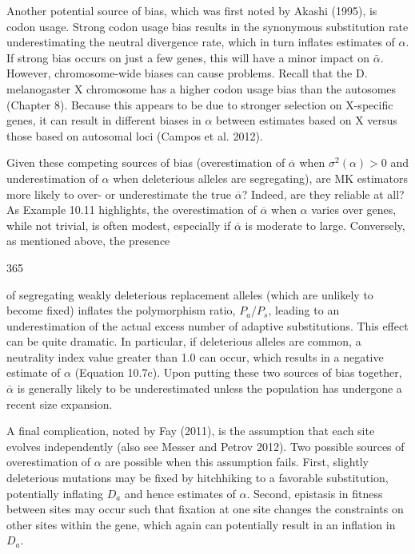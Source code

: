\documentclass{article}
\begin{document}
Another potential source of bias, which was first noted by Akashi (1995), is codon usage. Strong codon usage bias results in the synonymous substitution rate underestimating the neutral divergence rate, which in turn inflates estimates of  $ \alpha $. If strong bias occurs on just a few genes, this will have a minor impact on  $ \bar{\alpha} $. However, chromosome-wide biases can cause problems. Recall that the D. melanogaster X chromosome has a higher codon usage bias than the autosomes (Chapter 8). Because this appears to be due to stronger selection on X-specific genes, it can result in different biases in  $ \alpha $ between estimates based on X versus those based on autosomal loci (Campos et al. 2012).

Given these competing sources of bias (overestimation of $\overline{\alpha}$ when $\sigma^{2}(\alpha) > 0$ and underestimation of $\alpha$ when deleterious alleles are segregating), are MK estimators more likely to over- or underestimate the true $\overline{\alpha}$? Indeed, are they reliable at all? As Example 10.11 highlights, the overestimation of $\overline{\alpha}$ when $\alpha$ varies over genes, while not trivial, is often modest, especially if $\overline{\alpha}$ is moderate to large. Conversely, as mentioned above, the presence

365

of segregating weakly deleterious replacement alleles (which are unlikely to become fixed) inflates the polymorphism ratio,  $ P_a/P_s $, leading to an underestimation of the actual excess number of adaptive substitutions. This effect can be quite dramatic. In particular, if deleterious alleles are common, a neutrality index value greater than 1.0 can occur, which results in a negative estimate of  $ \alpha $ (Equation 10.7c). Upon putting these two sources of bias together,  $ \bar{\alpha} $ is generally likely to be underestimated unless the population has undergone a recent size expansion.

A final complication, noted by Fay (2011), is the assumption that each site evolves independently (also see Messer and Petrov 2012). Two possible sources of overestimation of  $ \alpha $ are possible when this assumption fails. First, slightly deleterious mutations may be fixed by hitchhiking to a favorable substitution, potentially inflating  $ D_{a} $ and hence estimates of  $ \alpha $. Second, epistasis in fitness between sites may occur such that fixation at one site changes the constraints on other sites within the gene, which again can potentially result in an inflation in  $ D_{a} $.
\end{document}
